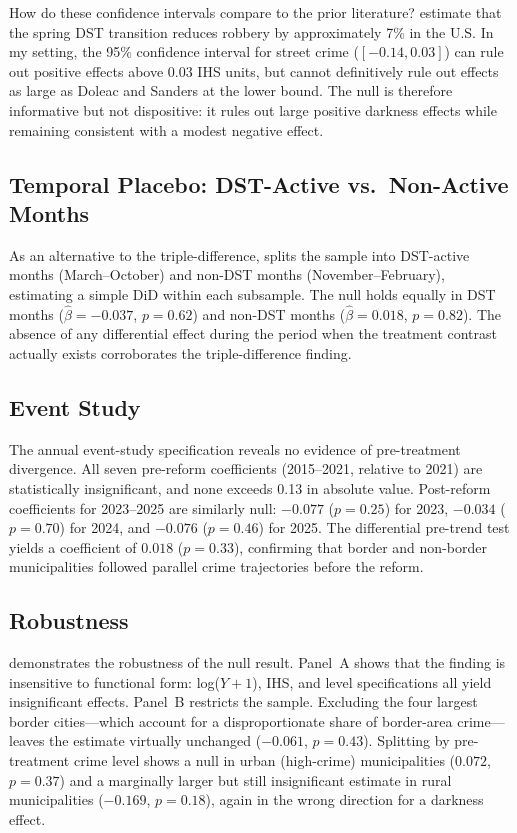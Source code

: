 \documentclass[12pt]{article}
\begin{document}
How do these confidence intervals compare to the prior literature? \citet{doleac2015} estimate that the spring DST transition reduces robbery by approximately 7\% in the U.S. In my setting, the 95\% confidence interval for street crime ($[-0.14, 0.03]$) can rule out positive effects above 0.03 IHS units, but cannot definitively rule out effects as large as Doleac and Sanders at the lower bound. The null is therefore informative but not dispositive: it rules out large positive darkness effects while remaining consistent with a modest negative effect.

\subsection{Temporal Placebo: DST-Active vs.\ Non-Active Months}



As an alternative to the triple-difference,  splits the sample into DST-active months (March--October) and non-DST months (November--February), estimating a simple DiD within each subsample. The null holds equally in DST months ($\hat{\beta} = -0.037$, $p = 0.62$) and non-DST months ($\hat{\beta} = 0.018$, $p = 0.82$). The absence of any differential effect during the period when the treatment contrast actually exists corroborates the triple-difference finding.

\subsection{Event Study}

The annual event-study specification reveals no evidence of pre-treatment divergence. All seven pre-reform coefficients (2015--2021, relative to 2021) are statistically insignificant, and none exceeds 0.13 in absolute value. Post-reform coefficients for 2023--2025 are similarly null: $-0.077$ ($p = 0.25$) for 2023, $-0.034$ ($p = 0.70$) for 2024, and $-0.076$ ($p = 0.46$) for 2025. The differential pre-trend test yields a coefficient of $0.018$ ($p = 0.33$), confirming that border and non-border municipalities followed parallel crime trajectories before the reform.

\subsection{Robustness}



 demonstrates the robustness of the null result. Panel~A shows that the finding is insensitive to functional form: log($Y + 1$), IHS, and level specifications all yield insignificant effects. Panel~B restricts the sample. Excluding the four largest border cities---which account for a disproportionate share of border-area crime---leaves the estimate virtually unchanged ($-0.061$, $p = 0.43$). Splitting by pre-treatment crime level shows a null in urban (high-crime) municipalities ($0.072$, $p = 0.37$) and a marginally larger but still insignificant estimate in rural municipalities ($-0.169$, $p = 0.18$), again in the wrong direction for a darkness effect.
\end{document}

